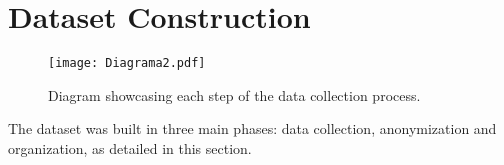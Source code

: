 \section{Dataset Construction}

\begin{figure*} [!ht]
    \centering
    \texttt{[image: Diagrama2.pdf]}
    \caption{Diagram showcasing each step of the data collection process.}
    \label{fig:diagrama}
\end{figure*}

The dataset was built in three main phases: data collection, anonymization and organization, as detailed in this section.






